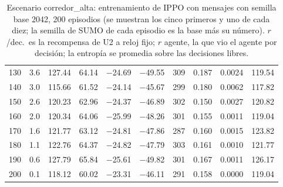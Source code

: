 \begin{table}[H]
\begin{tabular}{rrrrrrrrrr}
130 & 3.6 & 127.44 & 64.14 & $-$24.69 & $-$49.55 & 309 & 0.187 & 0.0024 & 119.54 \\
140 & 3.0 & 115.66 & 61.52 & $-$24.14 & $-$45.67 & 299 & 0.180 & 0.0062 & 117.82 \\
150 & 2.6 & 120.23 & 62.96 & $-$24.37 & $-$46.89 & 302 & 0.150 & 0.0027 & 120.82 \\
160 & 2.0 & 120.34 & 64.06 & $-$25.99 & $-$48.26 & 301 & 0.155 & 0.0011 & 119.04 \\
170 & 1.6 & 121.77 & 63.12 & $-$24.81 & $-$47.86 & 287 & 0.160 & 0.0015 & 123.82 \\
180 & 1.1 & 122.76 & 64.37 & $-$24.82 & $-$47.79 & 303 & 0.161 & 0.0010 & 121.77 \\
190 & 0.6 & 127.79 & 65.84 & $-$25.61 & $-$49.82 & 301 & 0.167 & 0.0011 & 126.17 \\
200 & 0.1 & 118.12 & 60.02 & $-$23.31 & $-$46.11 & 291 & 0.158 & 0.0000 & 119.04 \\
\bottomrule
\end{tabular}
\caption[Escenario corredor\_alta: entrenamiento de IPPO con mensajes, semilla base 2042]{Escenario corredor\_alta: entrenamiento de IPPO con mensajes con semilla base 2042, 200 episodios (se muestran los cinco primeros y uno de cada diez; la semilla de SUMO de cada episodio es la base más su número). $r$/dec.\ es la recompensa de U2 a reloj fijo; $r$ agente, la que vio el agente por decisión; la entropía se promedia sobre las decisiones libres.}
\label{tab:corredor_alta-ippo-vecinos-2042}
\end{table}


